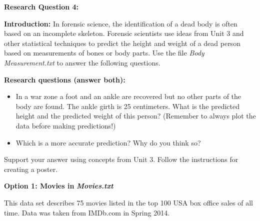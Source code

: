\bigskip{}


\bigskip{}
\bigskip{}
\bigskip{}
\bigskip{}


\textbf{\large{}Research Question 4:\bigskip{}
}{\large \par}

\textbf{Introduction:} In forensic science, the identification of
a dead body is often based on an incomplete skeleton. Forensic scientists
use ideas from Unit 3 and other statistical techniques to predict
the height and weight of a dead person based on measurements of bones
or body parts. Use the file \emph{Body Measurement.txt} to answer
the following questions.\bigskip{}


\textbf{Research questions (answer both): }
\begin{itemize}
\item In a war zone a foot and an ankle are recovered but no other parts
of the body are found. The ankle girth is 25 centimeters. What is
the predicted height and the predicted weight of this person? (Remember
to always plot the data before making predictions!) 
\item Which is a more accurate prediction? Why do you think so? 
\end{itemize}
Support your answer using concepts from Unit 3. Follow the instructions
for creating a poster.\newpage{}%

\textbf{\large{}Option 1: Movies in }\textbf{\emph{\large{}Movies.txt}}{\large \par}

This data set describes 75 movies listed in the top 100 USA box office
sales of all time. Data was taken from IMDb.com in Spring 2014.


